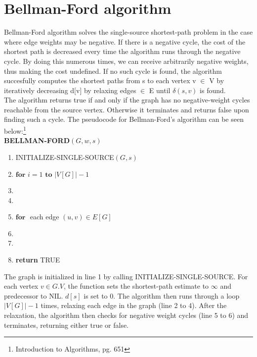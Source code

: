 \documentclass[11pt]{article}
\begin{document}
\section{Bellman-Ford algorithm}
Bellman-Ford algorithm solves the single-source shortest-path problem in the case where edge weights may be negative. If there is a negative cycle, the cost of the shortest path is decreased every time the algorithm runs through the negative cycle. By doing this numerous times, we can receive arbitrarily negative weights, thus making the cost undefined. If no such cycle is found, the algorithm succesfully computes the shortest paths from s to each vertex v $\in$ V by iteratively decreasing d[v] by relaxing edges $\in$ E until $\delta(s,v)$ is found.\\
The algorithm returns true if and only if the graph has no negative-weight cycles reachable from the source vertex. Otherwise it terminates and returns false upon finding such a cycle. The pseudocode for Bellman-Ford's algorithm can be seen below:\footnote{Introduction to Algorithms, pg. 651}\\

\textbf{BELLMAN-FORD$(G, w, s)$}
\begin{enumerate}
\setlength\itemsep{0em}
\item INITIALIZE-SINGLE-SOURCE$(G, s)$
\item $\textbf{for } i = 1 \textbf{ to } |V[G]| -1$
\item {}
\item \tab{}
\item $\textbf{for }$ each edge $(u,v) \in E[G]$
\item {}
\item \tab{}
\item \textbf{return } TRUE
\end{enumerate}

\noindent The graph is initialized in line 1 by calling INITIALIZE-SINGLE-SOURCE. For each vertex $v \in G.V$, the function sets the shortest-path estimate to $\infty$ and predecessor to NIL. $d[s]$ is set to 0. The algorithm then runs through a loop $|V[G]|-1$ times, relaxing each edge in the graph (line 2 to 4). After the relaxation, the algorithm then checks for negative weight cycles (line 5 to 6) and terminates, returning either true or false. 
\end{document}
